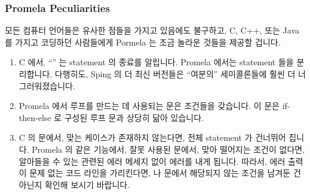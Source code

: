 \subsubsection{Promela Peculiarities}
\label{sec:formal:Promela Peculiarities}

모든 컴퓨터 언어들은 유사한 점들을 가지고 있음에도 불구하고, C, C++, 또는 Java
를 가지고 코딩하던 사람들에게 Pormela 는 조금 놀라운 것들을 제공할 겁니다.
\iffalse

Although all computer languages have underlying similarities,
Promela will provide some surprises to people used to coding in C,
C++, or Java.
\fi

\begin{enumerate}
\item	C 에서, ``\co{;}'' 는 statement 의 종료를 알립니다.
	Promela 에서는 statement 들을 분리합니다.
	다행히도, Sping 의 더 최신 버전들은 ``여분의'' 세미콜론들에 훨씬 더
	너그러워졌습니다.
\item	Promela 에서 루프를 만드는 데 사용되는  문은 조건들을 갖습니다.
	이  문은 if-then-else 로 구성된 루프 문과 상당히 닮아 있습니다.
\item	C 의  문에서, 맞는 케이스가 존재하지 않는다면, 전체
	statement 가 건너뛰어 집니다.
	Promela 의 같은 기능에서, 잘못 사용된  문에서, 맞아 떨어지는
	조건이 없다면, 알아들을 수 있는 관련된 에러 메세지 없이 에러를 내게
	됩니다.
	따라서, 에러 출력이 문제 없는 코드 라인을 가리킨다면,  나
	 문에서 해당되지 않는 조건을 남겨둔 건 아닌지 확인해 보시기
	바랍니다.
\iffalse


\end{enumerate}
